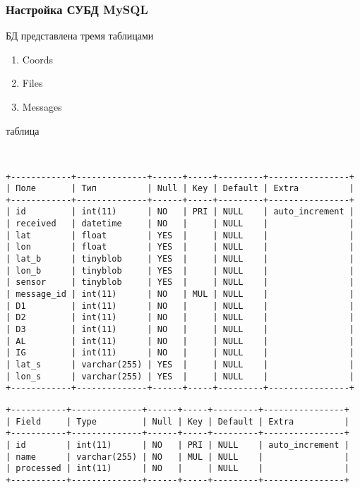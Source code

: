 \documentclass[12pt]{article}[a4paper,14pt,russian]
\begin{document}
	\subsubsection{Настройка СУБД MySQL}
	БД представлена тремя таблицами
	\begin{enumerate}
	\item Coords
	\item Files
	\item Messages
    \end{enumerate} 
	таблица
	\begin{verbatim}
    

+------------+--------------+------+-----+---------+----------------+
| Поле       | Тип          | Null | Key | Default | Extra          |
+------------+--------------+------+-----+---------+----------------+
| id         | int(11)      | NO   | PRI | NULL    | auto_increment |
| received   | datetime     | NO   |     | NULL    |                |
| lat        | float        | YES  |     | NULL    |                |
| lon        | float        | YES  |     | NULL    |                |
| lat_b      | tinyblob     | YES  |     | NULL    |                |
| lon_b      | tinyblob     | YES  |     | NULL    |                |
| sensor     | tinyblob     | YES  |     | NULL    |                |
| message_id | int(11)      | NO   | MUL | NULL    |                |
| D1         | int(11)      | NO   |     | NULL    |                |
| D2         | int(11)      | NO   |     | NULL    |                |
| D3         | int(11)      | NO   |     | NULL    |                |
| AL         | int(11)      | NO   |     | NULL    |                |
| IG         | int(11)      | NO   |     | NULL    |                |
| lat_s      | varchar(255) | YES  |     | NULL    |                |
| lon_s      | varchar(255) | YES  |     | NULL    |                |
+------------+--------------+------+-----+---------+----------------+
\end{verbatim}
\begin{verbatim}
+-----------+--------------+------+-----+---------+----------------+
| Field     | Type         | Null | Key | Default | Extra          |
+-----------+--------------+------+-----+---------+----------------+
| id        | int(11)      | NO   | PRI | NULL    | auto_increment |
| name      | varchar(255) | NO   | MUL | NULL    |                |
| processed | int(11)      | NO   |     | NULL    |                |
+-----------+--------------+------+-----+---------+----------------+
\end{verbatim}
\end{document}
